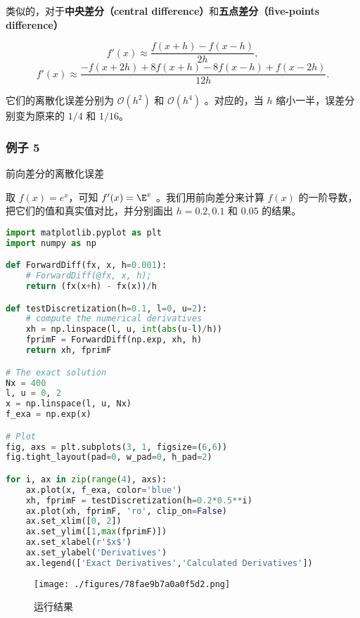 类似的，对于\textbf{中央差分（central difference）}和\textbf{五点差分（five-points difference）}

\begin{equation}
f'(x)\approx \frac{f(x+h)-f(x-h)}{2h},
\end{equation}
\begin{equation}
f'(x) \approx \frac{-f(x+2h)+8f(x+h)-8f(x-h)+f(x-2h)}{12h}.
\end{equation}

它们的离散化误差分别为 $\mathcal{O}(h^2)$ 和  $\mathcal{O}(h^4)$  。对应的，当  $h$  缩小一半，误差分别变为原来的 $1/4$ 和 $1/16$。

\subsubsection{例子 5}

前向差分的离散化误差

取 $f(x)=e^x$，可知  $f'(x)=\E^x$  。我们用前向差分来计算  $f(x)$  的一阶导数，把它们的值和真实值对比，并分别画出  $h=0.2, 0.1$  和  $0.05$  的结果。

\begin{lstlisting}[language=python]
import matplotlib.pyplot as plt
import numpy as np

def ForwardDiff(fx, x, h=0.001):
    # ForwardDiff(@fx, x, h);
    return (fx(x+h) - fx(x))/h

def testDiscretization(h=0.1, l=0, u=2):
    # compute the numerical derivatives
    xh = np.linspace(l, u, int(abs(u-l)/h))
    fprimF = ForwardDiff(np.exp, xh, h)
    return xh, fprimF

# The exact solution
Nx = 400
l, u = 0, 2
x = np.linspace(l, u, Nx)
f_exa = np.exp(x)

# Plot
fig, axs = plt.subplots(3, 1, figsize=(6,6))
fig.tight_layout(pad=0, w_pad=0, h_pad=2)

for i, ax in zip(range(4), axs):
    ax.plot(x, f_exa, color='blue')
    xh, fprimF = testDiscretization(h=0.2*0.5**i)
    ax.plot(xh, fprimF, 'ro', clip_on=False)
    ax.set_xlim([0, 2])
    ax.set_ylim([1,max(fprimF)])
    ax.set_xlabel(r'$x$')
    ax.set_ylabel('Derivatives')
    ax.legend(['Exact Derivatives','Calculated Derivatives'])
\end{lstlisting}

\begin{figure}[ht]
\centering
\texttt{[image: ./figures/78fae9b7a0a0f5d2.png]}
\caption{运行结果} \label{fig_NumErr_1}
\end{figure}

